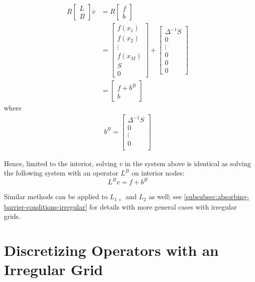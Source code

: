 \documentclass[11pt]{article}
\theoremstyle{definition}
\begin{document}
\begin{align}
R\begin{bmatrix}
 L \\
 B
\end{bmatrix} 
\overline{v}
&= 
R\begin{bmatrix}
f \\
b
\end{bmatrix} \\
 &= \begin{bmatrix}
 f(x_1) \\
 f(x_2) \\
 \vdots \\
 f(x_M) \\
 S \\
 0
\end{bmatrix} +
\begin{bmatrix}
\Delta^{-1}S \\
0  \\
\vdots \\ 
0 \\
0 \\
0
\end{bmatrix} \\
&= \begin{bmatrix}
f + b^B \\
b
\end{bmatrix}
\end{align}
where 
\begin{align}
b^B = 
\begin{bmatrix}
\Delta^{-1}S \\
0  \\
\vdots \\ 
0 \\
\end{bmatrix}
\end{align}

Hence, limited to the interior, solving $v$ in the system above is identical as solving the following system with an operator $L^B$ on interior nodes:
\begin{equation}
L^Bv= f+ b^B
\end{equation}

Similar methods can be applied to $L_{1+}$ and $L_2$ as well; see \ref{subsubsec:absorbing-barrier-conditions-irregular} for details with more general cases with irregular grids.




\section{Discretizing Operators with an Irregular Grid}
\end{document}
